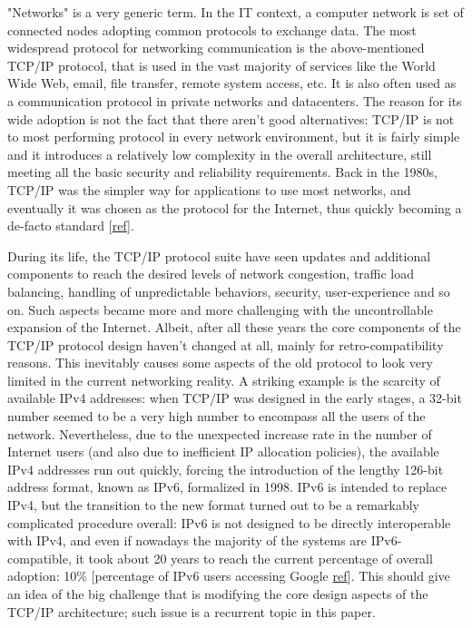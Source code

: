 "Networks" is a very generic term. In the IT context, a computer network is set of connected nodes adopting common protocols to exchange data. The most widespread protocol for networking communication is the above-mentioned TCP/IP protocol, that is used in the vast majority of services like the World Wide Web, email, file transfer, remote system access, etc. It is also often used as a communication protocol in private networks and datacenters.
The reason for its wide adoption is not the fact that there aren't good alternatives: TCP/IP is not to most performing protocol in every network environment, but it is fairly simple and it introduces a relatively low complexity in the overall architecture, still meeting all the basic security and reliability requirements. Back in the 1980s, TCP/IP was the simpler way for applications to use most networks, and eventually it was chosen as the protocol for the Internet, thus quickly becoming a de-facto standard [\href{http://www.computerworld.com/article/2593612/networking/tcp-ip.html}{ref}]. 


During its life, the TCP/IP protocol suite have seen updates and additional components to reach the desired levels of network congestion, traffic load balancing, handling of unpredictable behaviors, security, user-experience and so on. Such aspects became more and more challenging with the uncontrollable expansion of the Internet. 
Albeit, after all these years the core components of the TCP/IP protocol design haven't changed at all, mainly for retro-compatibility reasons. This inevitably causes some aspects of the old protocol to look very limited in the current networking reality. A striking example is the scarcity of available IPv4 addresses: when TCP/IP was designed in the early stages, a 32-bit number seemed to be a very high number to encompass all the users of the network. Nevertheless, due to the unexpected increase rate in the number of Internet users (and also due to inefficient IP allocation policies), the available IPv4 addresses run out quickly, forcing the introduction of the lengthy 126-bit address format, known as IPv6, formalized in 1998. IPv6 is intended to replace IPv4, but the transition to the new format turned out to be a remarkably complicated procedure overall: IPv6 is not designed to be directly interoperable with IPv4, and even if nowadays the majority of the systems are IPv6-compatible, it took about 20 years to reach the current percentage of overall adoption: 10\% [percentage of IPv6 users accessing Google \href{http://www.google.com/intl/en/ipv6/statistics.html#tab=ipv6-adoption&tab=ipv6-adoption}{ref}]. This should give an idea of the big challenge that is modifying the core design aspects of the TCP/IP architecture; such issue is a recurrent topic in this paper.


